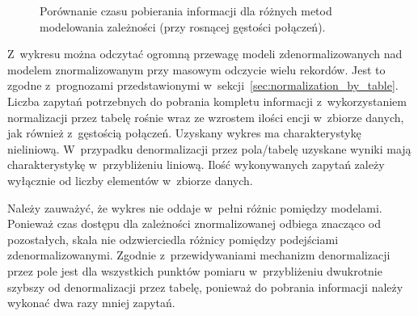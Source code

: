 \begin{figure}[ht!]
	\centering

	\caption{Porównanie czasu pobierania informacji dla różnych metod modelowania zależności (przy rosnącej gęstości połączeń).}
	\label{fig:select_time_relation_density_comparison}
\end{figure}

Z~wykresu można odczytać ogromną przewagę modeli zdenormalizowanych nad modelem znormalizowanym przy masowym odczycie wielu rekordów. Jest to zgodne z~prognozami przedstawionymi w~sekcji~\ref{sec:normalization_by_table}. Liczba zapytań potrzebnych do pobrania kompletu informacji z~wykorzystaniem normalizacji przez tabelę rośnie wraz ze wzrostem ilości encji w~zbiorze danych, jak również z~gęstością połączeń. Uzyskany wykres ma charakterystykę nieliniową. W~przypadku denormalizacji przez pola/tabelę uzyskane wyniki mają charakterystykę w~przybliżeniu liniową. Ilość wykonywanych zapytań zależy wyłącznie od liczby elementów w~zbiorze danych.

Należy zauważyć, że wykres nie oddaje w~pełni różnic pomiędzy modelami. Ponieważ czas dostępu dla zależności znormalizowanej odbiega znacząco od pozostałych, skala nie odzwierciedla różnicy pomiędzy podejściami zdenormalizowanymi. Zgodnie z~przewidywaniami mechanizm denormalizacji przez pole jest dla wszystkich punktów pomiaru w~przybliżeniu dwukrotnie szybszy od denormalizacji przez tabelę, ponieważ do pobrania informacji należy wykonać dwa razy mniej zapytań.

